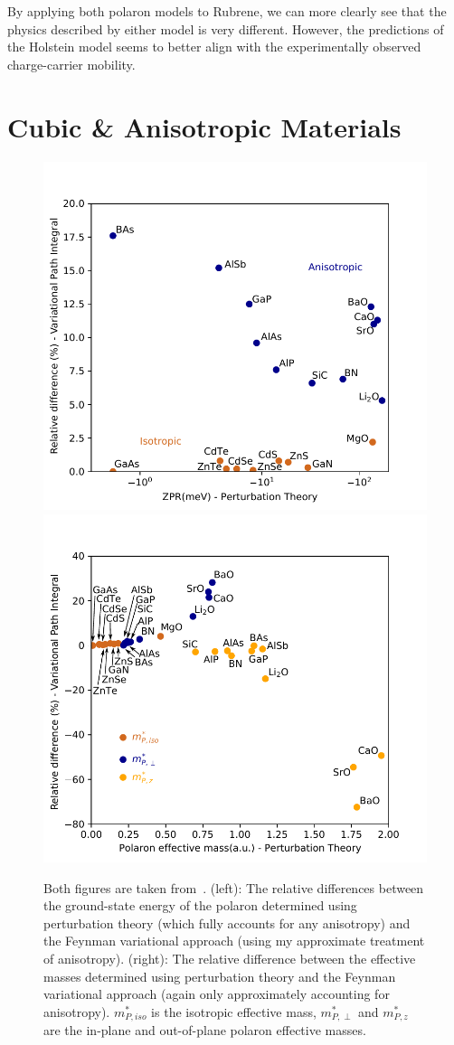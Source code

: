 By applying both polaron models to Rubrene, we can more clearly see that the physics described by either model is very different. However, the predictions of the Holstein model seems to better align with the experimentally observed charge-carrier mobility.

\section{Cubic \& Anisotropic Materials}
\label{sec:chap-sixth-third}

\begin{figure}[t]
    \centering
    \includegraphics[width=.49\textwidth]{figures/ff_zpr.pdf}
    \includegraphics[width=.49\textwidth]{figures/ff_emass.pdf}
    
    \caption{Both figures are taken from~\cite{guster_frohlich_2021}. (left): The relative differences between the ground-state energy of the polaron determined using perturbation theory (which fully accounts for any anisotropy) and the Feynman variational approach (using my approximate treatment of anisotropy). (right): The relative difference between the effective masses determined using perturbation theory and the Feynman variational approach (again only approximately accounting for anisotropy). $m^*_{P, iso}$ is the isotropic effective mass, $m^*_{P, \perp}$ and $m^*_{P, z}$ are the in-plane and out-of-plane polaron effective masses.}
    \label{fig:anisotropy}
\end{figure}

